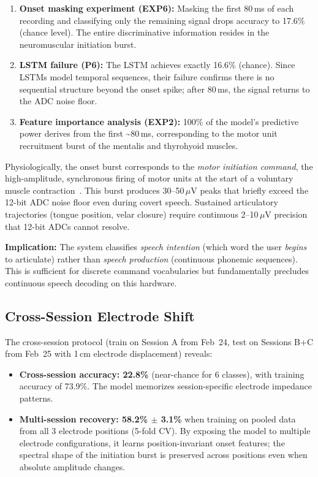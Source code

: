 \documentclass{article}
\begin{document}
\begin{enumerate}
    \item \textbf{Onset masking experiment (EXP6):} Masking the first 80\,ms of each recording and classifying only the remaining signal drops accuracy to 17.6\% (chance level). The entire discriminative information resides in the neuromuscular initiation burst.
    \item \textbf{LSTM failure (P6):} The LSTM achieves exactly 16.6\% (chance). Since LSTMs model temporal sequences, their failure confirms there is no sequential structure beyond the onset spike; after 80\,ms, the signal returns to the ADC noise floor.
    \item \textbf{Feature importance analysis (EXP2):} 100\% of the model's predictive power derives from the first \textasciitilde80\,ms, corresponding to the motor unit recruitment burst of the mentalis and thyrohyoid muscles.
\end{enumerate}

Physiologically, the onset burst corresponds to the \emph{motor initiation command}, the high-amplitude, synchronous firing of motor units at the start of a voluntary muscle contraction~\cite{jou2006}. This burst produces 30--50\,$\mu$V peaks that briefly exceed the 12-bit ADC noise floor even during covert speech. Sustained articulatory trajectories (tongue position, velar closure) require continuous 2--10\,$\mu$V precision that 12-bit ADCs cannot resolve.

\textbf{Implication:} The system classifies \emph{speech intention} (which word the user \emph{begins} to articulate) rather than \emph{speech production} (continuous phonemic sequences). This is sufficient for discrete command vocabularies but fundamentally precludes continuous speech decoding on this hardware.

\subsection{Cross-Session Electrode Shift}

The cross-session protocol (train on Session A from Feb~24, test on Sessions B+C from Feb~25 with 1\,cm electrode displacement) reveals:

\begin{itemize}
    \item \textbf{Cross-session accuracy: 22.8\%} (near-chance for 6 classes), with training accuracy of 73.9\%. The model memorizes session-specific electrode impedance patterns.
    \item \textbf{Multi-session recovery: 58.2\% $\pm$ 3.1\%} when training on pooled data from all 3 electrode positions (5-fold CV). By exposing the model to multiple electrode configurations, it learns position-invariant onset features; the spectral shape of the initiation burst is preserved across positions even when absolute amplitude changes.
\end{itemize}
\end{document}
